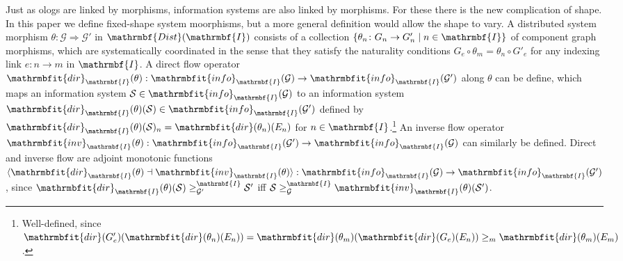 \documentclass{amsart}
\theoremstyle{remark}
\theoremstyle{definition}
\begin{document}
Just as ologs are linked by morphisms,
information systems are also linked by morphisms.
For these there is the new complication of shape.
In this paper we define fixed-shape system moorphisms,
but a more general definition would allow the shape to vary. 
%
A distributed system morphism 
$\theta \colon \mathcal{G} \Rightarrow \mathcal{G}'$
in $\mathrmbf{Dist}(\mathrmbf{I})$
consists of a collection 
$\{ \theta_{n} \colon G_{n} \rightarrow G'_{n} \mid n \in \mathrmbf{I} \}$
of component graph morphisms,
which are systematically coordinated in the sense that they satisfy the naturality conditions
$G_{e} \circ \theta_{m} = \theta_{n} \circ G'_{e}$
for any indexing link $e \colon n \rightarrow m$ in $\mathrmbf{I}$.
%
A direct flow operator 
$\mathrmbfit{dir}_{\mathrmbf{I}}(\theta) :
\mathrmbfit{info}_{\mathrmbf{I}}(\mathcal{G}) \rightarrow \mathrmbfit{info}_{\mathrmbf{I}}(\mathcal{G}')$
along $\theta$ can be define,
which maps an information system
$\mathcal{S} \in \mathrmbfit{info}_{\mathrmbf{I}}(\mathcal{G})$
to an information system
$\mathrmbfit{dir}_{\mathrmbf{I}}(\theta)(\mathcal{S}) \in \mathrmbfit{info}_{\mathrmbf{I}}(\mathcal{G}')$
defined by
$\mathrmbfit{dir}_{\mathrmbf{I}}(\theta)(\mathcal{S})_{n}
= \mathrmbfit{dir}(\theta_{n})(E_{n})$
for $n \in \mathrmbf{I}$.\footnote{Well-defined, since
$\mathrmbfit{dir}(G'_{e})(\mathrmbfit{dir}(\theta_{n})(E_{n}))
= \mathrmbfit{dir}(\theta_{m})(\mathrmbfit{dir}(G_{e})(E_{n}))
\geq_{m} \mathrmbfit{dir}(\theta_{m})(E_{m})$.}
%
An inverse flow operator
$\mathrmbfit{inv}_{\mathrmbf{I}}(\theta) :
\mathrmbfit{info}_{\mathrmbf{I}}(\mathcal{G}') \rightarrow \mathrmbfit{info}_{\mathrmbf{I}}(\mathcal{G})$
can similarly be defined.
Direct and inverse flow are adjoint monotonic functions
$
{\langle{\mathrmbfit{dir}_{\mathrmbf{I}}(\theta) \dashv \mathrmbfit{inv}_{\mathrmbf{I}}(\theta)}\rangle} :
\mathrmbfit{info}_{\mathrmbf{I}}(\mathcal{G}) \rightarrow \mathrmbfit{info}_{\mathrmbf{I}}(\mathcal{G}')$, since
$\mathrmbfit{dir}_{\mathrmbf{I}}(\theta)(\mathcal{S}) \geq^{\mathrmbf{I}}_{\mathcal{G}'} \mathcal{S}'$
iff
$\mathcal{S} \geq^{\mathrmbf{I}}_{\mathcal{G}} \mathrmbfit{inv}_{\mathrmbf{I}}(\theta)(\mathcal{S}')$.
\end{document}
